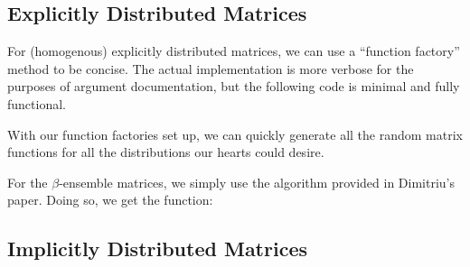 \subsection{Explicitly Distributed Matrices}

For (homogenous) explicitly distributed matrices, we can use a ``function factory'' method to be concise. The actual implementation is more verbose for the purposes of argument documentation, but the following code is minimal and fully functional. %



With our function factories set up, we can quickly generate all the random matrix functions for all the distributions our hearts could desire.


\newpage


For the $\beta$-ensemble matrices, we simply use the algorithm provided in Dimitriu's paper. Doing so, we get the function:




\newpage
\subsection{Implicitly Distributed Matrices}

